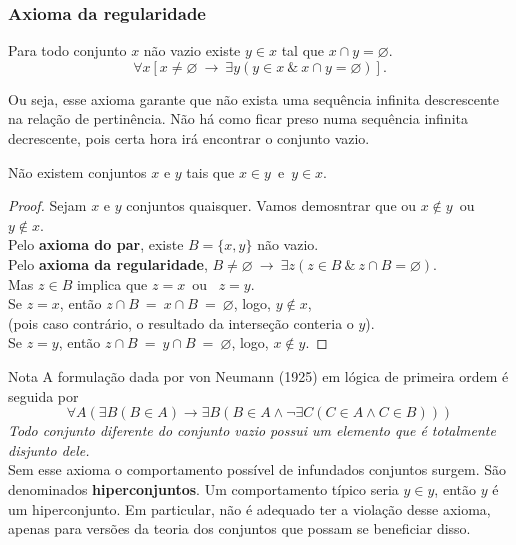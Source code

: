       \subsubsection{Axioma da regularidade}
         \begin{stat}
            Para todo conjunto $x$ não vazio existe $y \in x$ tal que $x \cap y = \varnothing$.
            $$ \forall x [x \neq \varnothing\ \rightarrow\ \exists y (y \in x\ \&\ x \cap y = \varnothing)].$$
         \end{stat}
         Ou seja, esse axioma garante que não exista uma sequência infinita descrescente na relação de pertinência. Não há como ficar preso numa sequência infinita decrescente, pois certa hora irá encontrar o conjunto vazio.
         \begin{theorem}
            Não existem conjuntos $x$ e $y$ tais que $x \in y$\ e\ $y \in x$.
         \end{theorem}
         \begin{proof}
            Sejam $x$ e $y$ conjuntos quaisquer.
            Vamos demosntrar que ou $x \notin y$\ ou\ $y \notin x$.\\
            Pelo \textbf{axioma do par}, existe $B = \{x,y\}$ não vazio.\\
            Pelo \textbf{axioma da regularidade}, $B \neq \varnothing\ \rightarrow\ \exists z (z \in B\ \&\ z \cap B = \varnothing).$\\
            Mas $z \in B$ implica que $z = x$\ ou \ $z = y$.\\            
            Se $z=x$, então $z \cap B\ =\ x \cap B\ =\ \varnothing$, logo, $y \notin x$,\\
            (pois caso contrário, o resultado da interseção conteria o $y$).\\
            Se $z=y$, então $z \cap B\ =\ y \cap B\ =\ \varnothing$, logo, $x \notin y$.
         \end{proof}
         \begin{mymdframed}{Nota}
            A formulação dada por von Neumann (1925) em lógica de primeira ordem é seguida por
            $$\forall A(\exists B(B\in A)\rightarrow \exists B(B\in A\land \neg \exists C(C\in A\land C\in B)))$$
            \emph{Todo conjunto diferente do conjunto vazio possui um elemento que é totalmente disjunto dele.}\\
            Sem esse axioma o comportamento possível de infundados conjuntos surgem. São denominados \textbf{hiperconjuntos}. Um comportamento típico seria $y \in y$, então $y$ é um hiperconjunto. Em particular, não é adequado ter a violação desse axioma, apenas para versões da teoria dos conjuntos que possam se beneficiar disso.
         \end{mymdframed}